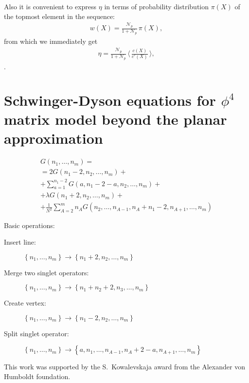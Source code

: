 \documentclass[twocolumn,showpacs,preprintnumbers,superscriptaddress,amsmath,floatfix,amssymb,secnumarabic]{revtex4}
\newcommand{\lr}[1]{ \left( #1 \right) }
\newcommand{\lrc}[1]{ \left\{ #1 \right\} }
\newcommand{\vev}[1]{ \langle \, #1 \, \rangle }
\begin{document}
Also it is convenient to express $\eta$ in terms of probability distribution $\pi\lr{X}$ of the topmost element in the sequence:
\begin{eqnarray}
\label{topmost_distrib}
 w\lr{X} = \frac{\mathcal{N}_p}{1 + \mathcal{N}_p} \, \pi\lr{X} ,
\end{eqnarray}
from which we immediately get
\begin{eqnarray}
\label{topmost_distrib}
 \eta = \frac{\mathcal{N}_p}{1 + \mathcal{N}_p} \, \vev{ \frac{c\lr{X}}{c'\lr{X}} } ,
\end{eqnarray} .

\section{Schwinger-Dyson equations for $\phi^4$ matrix model beyond the planar approximation}
\label{sec:phi4sd_nonplanar}

\begin{eqnarray}
\label{phi4sd_nonplanar}
 G\lr{n_1, \ldots, n_m}
 = \nonumber \\ =
 2 G\lr{n_1 - 2, n_2, \ldots, n_m}
 + \nonumber \\ +
 \sum\limits_{a=1}^{n_1-2}
 G\lr{a, n_1 - 2 - a, n_2, \ldots, n_m}
 + \nonumber \\ +
 \lambda G\lr{n_1 + 2, n_2, \ldots, n_m}
 + \nonumber \\ +
 \frac{1}{N^2} \sum\limits_{A=2}^{m} n_A
 G\lr{n_2, \ldots, n_{A-1}, n_A + n_1 - 2, n_{A+1}, \ldots, n_m}
\end{eqnarray}

Basic operations:
\begin{description}
  \item[Insert line:] $\lrc{n_1, \ldots, n_m} \rightarrow \lrc{n_1 + 2, n_2, \ldots, n_m}$
  \item[Merge two singlet operators:] $\lrc{n_1, \ldots, n_m} \rightarrow \lrc{n_1 + n_2 + 2, n_3, \ldots, n_m}$
  \item[Create vertex:] $\lrc{n_1, \ldots, n_m} \rightarrow \lrc{n_1 - 2, n_2, \ldots, n_m}$
  \item[Split singlet operator:] $\lrc{n_1, \ldots, n_m} \rightarrow \lrc{a, n_1, \ldots, n_{A-1}, n_A + 2 - a, n_{A+1}, \ldots, n_m}$
\end{description}

\begin{acknowledgments}
 This work was supported by the S.~Kowalevskaja award from the Alexander von Humboldt foundation.
\end{acknowledgments}



\end{document}
